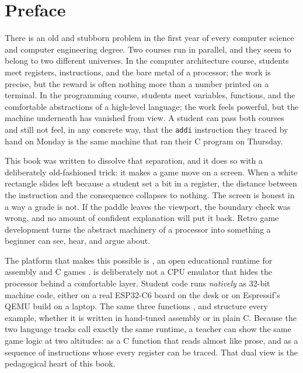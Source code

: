 \chapter*{Preface}

There is an old and stubborn problem in the first year of every computer science
and computer engineering degree. Two courses run in parallel, and they seem to
belong to two different universes. In the computer architecture course, students
meet registers, instructions, and the bare metal of a processor; the work is
precise, but the reward is often nothing more than a number printed on a
terminal. In the programming course, students meet variables, functions, and
the comfortable abstractions of a high-level language; the work feels powerful,
but the machine underneath has vanished from view. A student can pass both
courses and still not feel, in any concrete way, that the \texttt{addi}
instruction they traced by hand on Monday is the same machine that ran their C
program on Thursday.

This book was written to dissolve that separation, and it does so with a
deliberately old-fashioned trick: it makes a game move on a screen. When a
white rectangle slides left because a student set a bit in a register, the
distance between the instruction and the consequence collapses to nothing. The
screen is honest in a way a grade is not. If the paddle leaves the viewport, the
boundary check was wrong, and no amount of confident explanation will put it
back. Retro game development turns the abstract machinery of a processor into
something a beginner can see, hear, and argue about.

The platform that makes this possible is \prg, an open educational runtime for
\riscv assembly and C games \citep{prg32repo}. \prg is deliberately not a CPU
emulator that hides the processor behind a comfortable layer. Student code runs
\emph{natively} as 32-bit \riscv machine code, either on a real ESP32\nobreakdash-C6
board on the desk or on Espressif's QEMU build on a laptop. The same three
functions ,  and  structure every
example, whether it is written in hand-tuned assembly or in plain C. Because the
two language tracks call exactly the same runtime, a teacher can show the same
game logic at two altitudes: as a C function that reads almost like prose, and as
a sequence of \riscv instructions whose every register can be traced. That dual
view is the pedagogical heart of this book.

